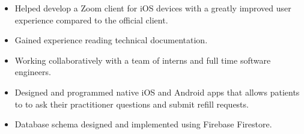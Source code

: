 \documentclass[10pt,letter,ragged2e]{altacv}
\begin{document}
\begin{itemize}
  \item Helped develop a Zoom client for iOS devices with a greatly improved user experience compared to the official client.
  \item Gained experience reading technical documentation.
  \item Working collaboratively with a team of interns and full time software engineers.
\end{itemize}

\divider

\begin{itemize}
  \item Designed and programmed native iOS and Android apps that allows patients to to ask their practitioner questions and submit refill requests. 
  \item Database schema designed and implemented using Firebase Firestore.
\end{itemize}

\divider



\end{document}
